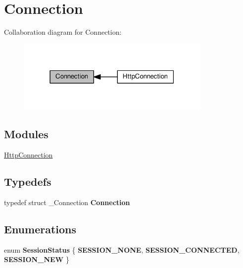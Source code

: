 \hypertarget{group__connection}{}\section{Connection}
\label{group__connection}
Collaboration diagram for Connection\+:\nopagebreak
\begin{figure}[H]
\begin{center}
\leavevmode
\includegraphics[width=267pt]{group__connection}
\end{center}
\end{figure}
\subsection*{Modules}
\begin{DoxyCompactItemize}
\item 
\hyperlink{group__http__connection}{Http\+Connection}
\end{DoxyCompactItemize}
\subsection*{Typedefs}
\begin{DoxyCompactItemize}
\item 
\mbox{\label{group__connection_gaf241e6d0ce6d580ee96096edbbda6b60}} 
typedef struct \+\_\+\+Connection {\bfseries Connection}
\end{DoxyCompactItemize}
\subsection*{Enumerations}
\begin{DoxyCompactItemize}
\item 
\mbox{\label{group__connection_gaa68bfc8983f200bfbae62a07dd04ebf0}} 
enum {\bfseries Session\+Status} \{ \newline
{\bfseries S\+E\+S\+S\+I\+O\+N\+\_\+\+N\+O\+NE}, 
\newline
{\bfseries S\+E\+S\+S\+I\+O\+N\+\_\+\+C\+O\+N\+N\+E\+C\+T\+ED}, 
\newline
{\bfseries S\+E\+S\+S\+I\+O\+N\+\_\+\+N\+EW}
 \}
\end{DoxyCompactItemize}
